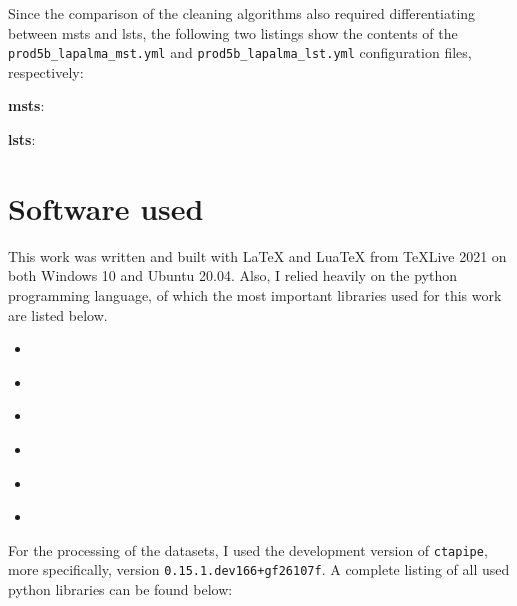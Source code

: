 Since the comparison of the cleaning algorithms also required differentiating between \glspl{mst}
and \glspl{lst}, the following two listings show the contents of the \texttt{prod5b\_lapalma\_mst.yml} and
\texttt{prod5b\_lapalma\_lst.yml} configuration files, respectively:
\begin{description}
    \item \textbf{\glspl{mst}}:\medskip
    \begin{spacing}{0.5}
        \begin{mdframed}[backgroundcolor=codebg, hidealllines=true, leftmargin=0cm,rightmargin=0cm, skipabove=0pt, innerleftmargin=0,innerrightmargin=0,]
        
        \end{mdframed}
    \end{spacing}

    \item \textbf{\glspl{lst}}:\medskip
    \begin{spacing}{0.5}
        \begin{mdframed}[backgroundcolor=codebg, hidealllines=true, leftmargin=0cm,rightmargin=0cm, skipabove=0pt, innerleftmargin=0,innerrightmargin=0,]
        
        \end{mdframed}
    \end{spacing}
\end{description}


\section{Software used}

This work was written and built with \LaTeX{} and Lua\TeX{} from \TeX Live 2021 on both Windows 10 and Ubuntu 20.04.
Also, I relied heavily on the python programming language, of which the most important libraries used
for this work are listed below.
\begin{itemize}
    \item \numpy{}~\cite{numpy}
    \item \pandas{}~\cite{pandas}
    \item \matplotlib{}~\cite{matplotlib}
    \item \astropy{}~\cite{astropy1, astropy2}
    \item \pyirf{}~\cite{pyirf}
    \item \sklearn{}~\cite{scikit-learn}
\end{itemize}

For the processing of the datasets, I used the development version of \texttt{ctapipe}, more specifically, version
\texttt{0.15.1.dev166+gf26107f}. A complete listing of all used python libraries can be found below:
\begin{spacing}{0.5}
    \begin{mdframed}[backgroundcolor=codebg, hidealllines=true, leftmargin=0cm,rightmargin=0cm, skipabove=0pt, innerleftmargin=0,innerrightmargin=0,]
    
    \end{mdframed}
\end{spacing}
